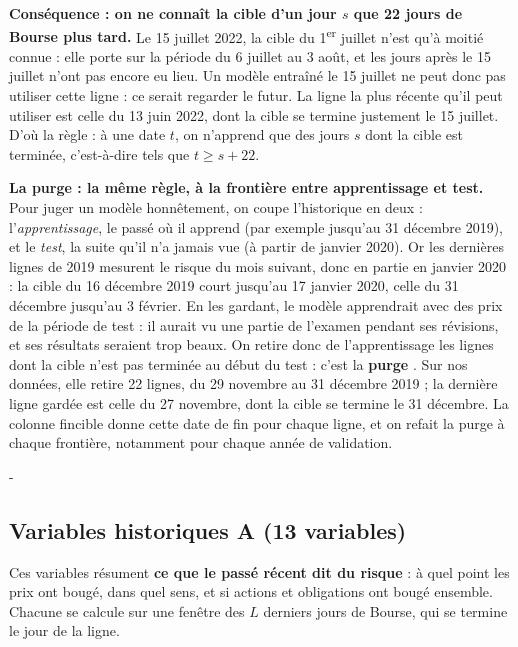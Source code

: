 \documentclass[10pt,a4paper]{article}
\makeatletter
\newcommand{\besoin}[1]{\par\penalty-100\begingroup\setlength{\dimen@}{#1}%
  \dimen@ii\pagegoal\advance\dimen@ii-\pagetotal
  \ifdim\dimen@>\dimen@ii\ifdim\dimen@ii>\z@\vfil\fi\break\fi\endgroup}
\let\soussectionorigine\subsection
\renewcommand{\subsection}{\besoin{5\baselineskip}\soussectionorigine}
\newcommand{\coupure}{\textunderscore\allowbreak}
\newcommand{\fic}[1]{{\small\ttfamily\let\_\coupure #1}}
\makeatother
\begin{document}
\textbf{Conséquence : on ne connaît la cible d'un jour $s$ que 22 jours de Bourse plus tard.} Le 15 juillet 2022, la cible du 1\textsuperscript{er} juillet n'est qu'à moitié connue : elle porte sur la période du 6 juillet au 3 août, et les jours après le 15 juillet n'ont pas encore eu lieu. Un modèle entraîné le 15 juillet ne peut donc pas utiliser cette ligne : ce serait regarder le futur. La ligne la plus récente qu'il peut utiliser est celle du 13 juin 2022, dont la cible se termine justement le 15 juillet. D'où la règle : à une date $t$, on n'apprend que des jours $s$ dont la cible est terminée, c'est-à-dire tels que $t\ge s+22$.

\textbf{La purge : la même règle, à la frontière entre apprentissage et test.} Pour juger un modèle honnêtement, on coupe l'historique en deux : l'\emph{apprentissage}, le passé où il apprend (par exemple jusqu'au 31 décembre 2019), et le \emph{test}, la suite qu'il n'a jamais vue (à partir de janvier 2020). Or les dernières lignes de 2019 mesurent le risque du mois suivant, donc en partie en janvier 2020 : la cible du 16 décembre 2019 court jusqu'au 17 janvier 2020, celle du 31 décembre jusqu'au 3 février. En les gardant, le modèle apprendrait avec des prix de la période de test : il aurait vu une partie de l'examen pendant ses révisions, et ses résultats seraient trop beaux. On retire donc de l'apprentissage les lignes dont la cible n'est pas terminée au début du test : c'est la \textbf{purge} \cite{lopezdeprado}. Sur nos données, elle retire 22 lignes, du 29 novembre au 31 décembre 2019 ; la dernière ligne gardée est celle du 27 novembre, dont la cible se termine le 31 décembre. La colonne \fic{fin\_cible} donne cette date de fin pour chaque ligne, et on refait la purge à chaque frontière, notamment pour chaque année de validation.

\subsection{Variables historiques A (13 variables)}
Ces variables résument \textbf{ce que le passé récent dit du risque} : à quel point les prix ont bougé, dans quel sens, et si actions et obligations ont bougé ensemble. Chacune se calcule sur une fenêtre des $L$ derniers jours de Bourse, qui se termine le jour de la ligne.
\end{document}
